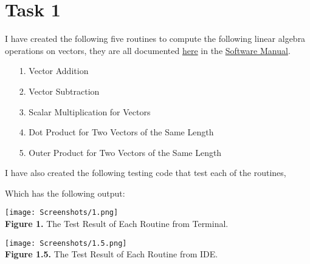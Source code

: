 \documentclass{article}
\begin{document}
\section*{Task 1}
I have created the following five routines to compute the following linear algebra operations on vectors, they are all documented \href{https://github.com/GoByMark/math4610/blob/main/Homework_Tasks/Tasksheet_09/src/Task_1.py}{here} in the \href{https://github.com/GoByMark/math4610/blob/main/Homework_Tasks/Software_Manual/Software_Manual_toc.md}{Software Manual}.\\
\begin{enumerate}
\item[1.] Vector Addition\\

\item[2.] Vector Subtraction\\

\item[3.] Scalar Multiplication for Vectors\\

\item[4.] Dot Product for Two Vectors of the Same Length\\

\item[5.] Outer Product for Two Vectors of the Same Length\\

\end{enumerate}
I have also created the following testing code that test each of the routines, 



Which has the following output:
\begin{center}
\texttt{[image: Screenshots/1.png]}\\
{\bf Figure 1.} The Test Result of Each Routine from Terminal.\\

\vspace{5pt}

\texttt{[image: Screenshots/1.5.png]}\\
{\bf Figure 1.5.} The Test Result of Each Routine from IDE.\\
\end{center}
\end{document}
